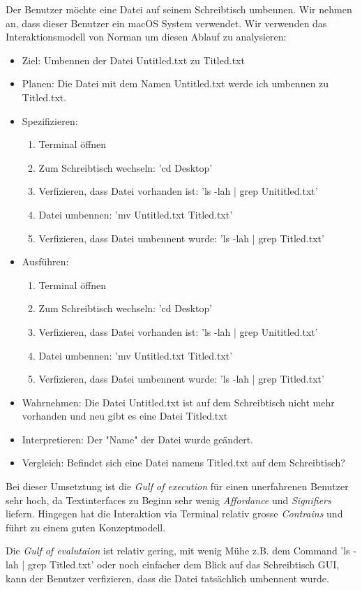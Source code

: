 Der Benutzer möchte eine Datei auf seinem Schreibtisch umbennen. Wir nehmen an,
dass dieser Benutzer ein macOS System verwendet. Wir verwenden
das Interaktionsmodell von Norman um diesen Ablauf zu analysieren:

\begin{itemize}
  \item Ziel: Umbennen der Datei Untitled.txt zu Titled.txt
  \item Planen: Die Datei mit dem Namen Untitled.txt werde ich umbennen zu
    Titled.txt.
  \item Spezifizieren: 
    \begin{enumerate}
      \item Terminal öffnen
      \item Zum Schreibtisch wechseln: 'cd Desktop'
      \item Verfizieren, dass Datei vorhanden ist: 'ls -lah | grep
        Unititled.txt'
      \item Datei umbennen: 'mv Untitled.txt Titled.txt'
      \item Verfizieren, dass Datei umbennent wurde: 'ls -lah | grep Titled.txt'
    \end{enumerate}
  \item Ausführen:
    \begin{enumerate}
      \item Terminal öffnen
      \item Zum Schreibtisch wechseln: 'cd Desktop'
      \item Verfizieren, dass Datei vorhanden ist: 'ls -lah | grep
        Unititled.txt'
      \item Datei umbennen: 'mv Untitled.txt Titled.txt'
      \item Verfizieren, dass Datei umbennent wurde: 'ls -lah | grep Titled.txt'
    \end{enumerate}
  \item Wahrnehmen: Die Datei Untitled.txt ist auf dem Schreibtisch nicht mehr
    vorhanden und neu gibt es eine Datei Titled.txt
  \item Interpretieren: Der "Name" der Datei wurde geändert.
  \item Vergleich: Befindet sich eine Datei namens Titled.txt auf dem
    Schreibtisch? 
\end{itemize}

Bei dieser Umsetztung ist die \textit{Gulf of execution} für einen unerfahrenen
Benutzer sehr hoch, da Textinterfaces zu Beginn sehr wenig \textit{Affordance}
und \textit{Signifiers} liefern. Hingegen hat die Interaktion via Terminal
relativ grosse \textit{Contrains} und führt zu einem guten Konzeptmodell.

Die \textit{Gulf of evalutaion} ist relativ gering, mit wenig Mühe z.B. dem
Command 'ls -lah | grep Titled.txt' oder noch einfacher dem Blick auf das
Schreibtisch GUI, kann der Benutzer verfizieren, dass die Datei tatsächlich
umbennent wurde. 
    

